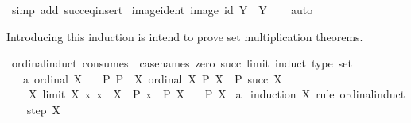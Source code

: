 \begin{isabellebody}
%
\isatagproof
{}\isamarkupfalse%
\ {\isacharparenleft}{\kern0pt}simp\ add{\isacharcolon}{\kern0pt}\ succ{\isacharunderscore}{\kern0pt}eq{\isacharunderscore}{\kern0pt}insert{\isacharparenright}{\kern0pt}%
\endisatagproof
{\isafoldproof}%
%
\isadelimproof
\isanewline
%
\endisadelimproof
\isanewline
{}\isamarkupfalse%
\ image{\isacharunderscore}{\kern0pt}ident{\isacharcolon}{\kern0pt}\ {\isachardoublequoteopen}image\ id\ Y\ {\isacharequal}{\kern0pt}\ Y{\isachardoublequoteclose}\isanewline
%
\isadelimproof
\ \ %
\endisadelimproof
%
\isatagproof
{}\isamarkupfalse%
\ auto%
\endisatagproof
{\isafoldproof}%
%
\isadelimproof
%
\endisadelimproof
%
\begin{isamarkuptext}%
Introducing this induction is intend to prove set multiplication theorems.%
\end{isamarkuptext}\isamarkuptrue%
\isamarkupfalse%
\ ordinal{\isacharunderscore}{\kern0pt}induct{}\ {\isacharbrackleft}{\kern0pt}consumes\ {}{\isacharcomma}{\kern0pt}\ case{\isacharunderscore}{\kern0pt}names\ zero\ succ\ limit{\isacharcomma}{\kern0pt}\ induct\ type{\isacharcolon}{\kern0pt}\ set{\isacharbrackright}{\kern0pt}{\isacharcolon}{\kern0pt}\isanewline
\ \ \ a{\isacharcolon}{\kern0pt}\ {\isachardoublequoteopen}ordinal\ X{\isachardoublequoteclose}\isanewline
\ \ \ P{\isacharcolon}{\kern0pt}\ {\isachardoublequoteopen}P\ {}{\isachardoublequoteclose}\ {\isachardoublequoteopen}{\isasymAnd}X{\isachardot}{\kern0pt}\ {\isasymlbrakk}ordinal\ X{\isacharsemicolon}{\kern0pt}\ P\ X{\isasymrbrakk}\ {\isasymLongrightarrow}\ P\ {\isacharparenleft}{\kern0pt}succ\ X{\isacharparenright}{\kern0pt}{\isachardoublequoteclose}\isanewline
\ \ \ \ {\isachardoublequoteopen}{\isasymAnd}X{\isachardot}{\kern0pt}\ {\isasymlbrakk}limit\ X{\isacharsemicolon}{\kern0pt}\ {\isasymAnd}x{\isachardot}{\kern0pt}\ x\ {\isasymin}\ X\ {\isasymLongrightarrow}\ P\ x{\isasymrbrakk}\ {\isasymLongrightarrow}\ P\ {\isacharparenleft}{\kern0pt}{\isasymUnion}X{\isacharparenright}{\kern0pt}{\isachardoublequoteclose}\isanewline
\ \ \ {\isachardoublequoteopen}P\ X{\isachardoublequoteclose}\isanewline
%
\isadelimproof
%
\endisadelimproof
%
\isatagproof
{}\isamarkupfalse%
\ a\isanewline
{}\isamarkupfalse%
\ {\isacharparenleft}{\kern0pt}induction\ X\ rule{\isacharcolon}{\kern0pt}\ ordinal{\isacharunderscore}{\kern0pt}induct{\isacharparenright}{\kern0pt}\isanewline
\ \ \isamarkupfalse%
\ {\isacharparenleft}{\kern0pt}step\ X{\isacharparenright}{\kern0pt}\isanewline

\end{isabellebody}
